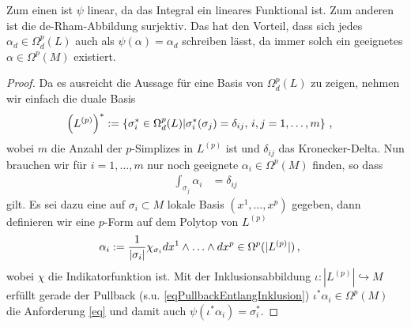   \begin{folgerung}
    Zum einen ist \( \psi \) linear, da das Integral ein lineares Funktional ist.
    Zum anderen ist die de-Rham-Abbildung surjektiv.
    Das hat den Vorteil, dass sich jedes \( \alpha_{d}\in\Omega_{d}^{p}(L) \) auch als \( \psi(\alpha) = \alpha_{d} \) schreiben lässt, da
    immer solch ein geeignetes \( \alpha\in\Omega^{p}(M) \) existiert.
    \begin{proof}
      Da es ausreicht die Aussage für eine Basis von \( \Omega_{d}^{p}(L) \) zu zeigen, nehmen wir einfach die duale Basis 
      \begin{align}
        \left(L^{(p)}\right)^{*} 
            &:= \left\{\sigma_{i}^{*} \in \Omega_{d}^{p}(L) \middle| \sigma_{i}^{*}(\sigma_{j}) = \delta_{ij}
                                ,\, i,j=1,\ldots,m \right\} \,\text{,}
      \end{align}
      wobei \( m \) die Anzahl der \( p \)-Simplizes in \( L^{(p)} \) ist und \( \delta_{ij} \) das Kronecker-Delta.
      Nun brauchen wir für \(i=1,\ldots,m \) nur noch geeignete \( \alpha_{i}\in\Omega^{p}(M) \) finden, so dass
      \begin{align}
        \label{eq}
        \int_{\sigma_{j}} \alpha_{i} &= \delta_{ij}
      \end{align}
      gilt. Es sei dazu eine auf \( \sigma_{i}\subset M \) lokale Basis \( \left( x^{1},\ldots,x^{p} \right) \) gegeben, dann definieren
      wir eine \( p \)-Form auf dem Polytop von \( L^{(p)} \)
      \begin{align}
        \alpha_{i} &:= \frac{1}{|\sigma_{i}|} \chi_{\sigma_{i}} dx^{1}\wedge\ldots\wedge dx^{p} \in \Omega^{p}(|L^{(p)}|) \,\text{,}
      \end{align}
      wobei \( \chi \) die Indikatorfunktion ist.
      Mit der Inklusionsabbildung \( \iota: |L^{(p)}| \hookrightarrow M\) erfüllt gerade der Pullback (s.u.
      \eqref{eqPullbackEntlangInklusion})
      \( \iota^{*}\alpha_{i}\in\Omega^{p}(M) \) die Anforderung \eqref{eq} 
      und damit auch \( \psi(\iota^{*}\alpha_{i}) = \sigma^{*}_{i} \).
    \end{proof}
  \end{folgerung}

